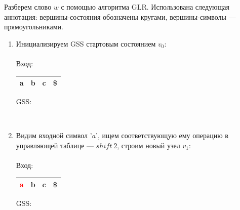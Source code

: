 \begin{example}
    Разберем слово $w$ с помощью алгоритма GLR. Использована следующая аннотация: вершины-состояния обозначены кругами, вершины-символы --- прямоугольниками.
    \begin{enumerate}
        \item Инициализируем GSS стартовым состоянием $v_0$: \\ \\
        Вход: \,
        \begin{tabular}[c]{ |c|c|c|c| }
            \hline a & b & c & \$ \\ \hline
        \end{tabular}
        \qquad GSS: \,
        \\

        \item Видим входной символ '$a$', ищем соответствующую ему операцию в управляющей таблице --- $shift\ 2$, строим новый узел $v_1$: \\ \\
        Вход: \,
        \begin{tabular}[c]{ |c|c|c|c| }
            \hline \textcolor{red}{a} & b & c & \$ \\ \hline
        \end{tabular}
        \qquad GSS: \,
        \begin{tikzpicture}[x=0.5pt,y=0.5pt,yscale=-1,xscale=1]



\end{tikzpicture}
\end{enumerate}
\end{example}
